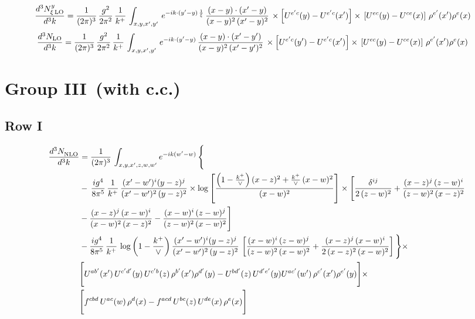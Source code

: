 \documentclass[9pt]{article}
\numberwithin{equation}{section}
\begin{document}
\begin{align}
    \frac{d^{3}N^{y}_{\xi\,\rm LO}}{d^{3}k} & = \frac{1}{(2\pi)^{3}}\, \frac{g^{2}}{2\pi^{2}}\, \frac{1}{k^{+}}\,\int_{x,y,x',y'}\, e^{-ik\cdot (y'-y)\,\frac{1}{\xi}}\, \frac{(x-y)\cdot (x'-y)}{(x-y)^{2}\,(x'-y)^{2}}\,\times \left[U^{e'c}(y) - U^{e'c}(x')\right] \times\, \left[U^{ec}(y) - U^{ce}(x)\right]\, \rho^{e'}(x') \rho^{e}(x) 
\end{align}
\begin{align}
    \frac{d^{3}N_{\rm LO}}{d^{3}k} & = \frac{1}{(2\pi)^{3}}\, \frac{g^{2}}{2\pi^{2}}\, \frac{1}{k^{+}}\,\int_{x,y,x',y'}\, e^{-ik\cdot (y'-y)}\, \frac{(x-y)\cdot (x'-y')}{(x-y)^{2}\,(x'-y')^{2}}\,\times \left[U^{e'c}(y') - U^{e'c}(x')\right] \times\, \left[U^{ec}(y) - U^{ce}(x)\right]\, \rho^{e'}(x') \rho^{e}(x) 
\end{align}
\section{Group III\, (with c.c.)}
\subsection{Row I}
\begin{align}
     \frac{d^{3}N_{\rm NLO}^{\rm}}{d^{3}k}  & =   \frac{1}{(2\pi)^{3}}\, \int_{x,y,x',z,w,w^{\prime}} e^{-ik(w^{\prime}-w)}\, \Bigg\{\notag \\
& -\,\frac{ig^{4}}{8\pi^{5}}\,\frac{1}{k^{+}}\,\frac{(x'-w')^{i}(y-z)^{j}}{(x'-w')^{2}\,(y-z)^{2}}\times \log{\left[\frac{\left(1-\frac{k^{+}}{\vee}\right)(x-z)^{2}+\frac{k^{+}}{\vee}\,(x-w)^{2}}{(x-w)^{2}}\right]}\times \Bigg[\frac{\delta^{ij}}{2\,(z-w)^{2}}+\frac{(x-z)^{j}\,(z-w)^{i}}{(z-w)^{2}\,(x-z)^{2}}\notag \\ & -\frac{(x-z)^{j}\,(x-w)^{i}}{(x-w)^{2}\,(x-z)^{2}}-\frac{(x-w)^{i}\,(z-w)^{j}}{(z-w)^{2}\,(x-w)^{2}}\Bigg] \notag \\
& -\frac{ig^{4}}{8\pi^{5}}\,\frac{1}{k^{+}}\,\log{\left(1-\frac{k^{+}}{\vee}\right)}\,\frac{(x'-w')^{i}(y-z)^{j}}{(x'-w')^{2}\,(y-z)^{2}}\,\left[\frac{(x-w)^{i}\,(z-w)^{j}}{(z-w)^{2}\,(x-w)^{2}}+\frac{(x-z)^{j}\,(x-w)^{i}}{2\,(x-z)^{2}\, (x-w)^{2}}\right]\Bigg\}\times \notag \\ &  \Bigg[U^{ab'}(x')\,U^{c'd'}(y)\,U^{c'b}(z)\,\rho^{b'}(x')\rho^{d'}(y)-U^{bd'}(z)\,U^{d'e'}(y)U^{ac'}(w')\,\rho^{c'}(x')\rho^{e'}(y)\Bigg]\times\notag \\ & \Bigg[f^{cbd}\,U^{ac}(w)\,\rho^{d}(x)-f^{acd}\, U^{bc}(z)\,U^{de}(x)\,\rho^{e}(x)\Bigg]
\end{align}
\end{document}
